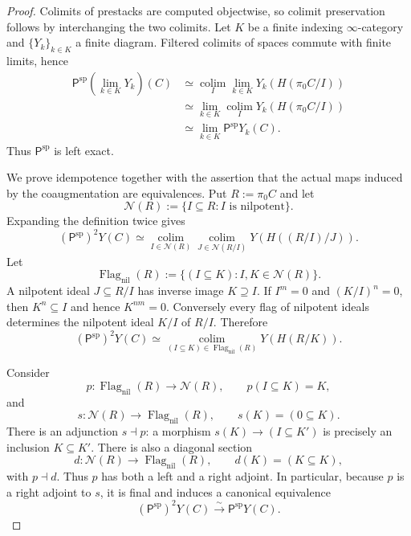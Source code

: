 \begin{proof}
Colimits of prestacks are computed objectwise, so colimit preservation follows
by interchanging the two colimits.  Let $K$ be a finite indexing
$\infty$-category and $\{Y_k\}_{k\in K}$ a finite diagram.  Filtered colimits
of spaces commute with finite limits, hence
\[
\begin{aligned}
    \mathsf P^{\mathrm{sp}}\!\left(\lim_{k\in K}Y_k\right)(C)
    &\simeq
    \operatorname*{colim}_{I}
    \lim_{k\in K}Y_k(H(\pi_0C/I))\\
    &\simeq
    \lim_{k\in K}
    \operatorname*{colim}_{I}
    Y_k(H(\pi_0C/I))\\
    &\simeq
    \lim_{k\in K}
    \mathsf P^{\mathrm{sp}}Y_k(C).
\end{aligned}
\]
Thus $\mathsf P^{\mathrm{sp}}$ is left exact.

We prove idempotence together with the assertion that the actual maps induced
by the coaugmentation are equivalences.  Put $R:=\pi_0C$ and let
\[
    \mathcal N(R)
    :=
    \{I\subseteq R:I\text{ is nilpotent}\}.
\]
Expanding the definition twice gives
\[
    (\mathsf P^{\mathrm{sp}})^2Y(C)
    \simeq
    \operatorname*{colim}_{I\in\mathcal N(R)}
    \operatorname*{colim}_{J\in\mathcal N(R/I)}
    Y\!\left(H((R/I)/J)\right).
\]
Let
\[
    \operatorname{Flag}_{\mathrm{nil}}(R)
    :=
    \{(I\subseteq K):I,K\in\mathcal N(R)\}.
\]
A nilpotent ideal $J\subseteq R/I$ has inverse image $K\supseteq I$.  If
$I^m=0$ and $(K/I)^n=0$, then $K^n\subseteq I$ and hence $K^{nm}=0$.
Conversely every flag of nilpotent ideals determines the nilpotent ideal
$K/I$ of $R/I$.  Therefore
\[
\boxed{
    (\mathsf P^{\mathrm{sp}})^2Y(C)
    \simeq
    \operatorname*{colim}_{(I\subseteq K)\in
      \operatorname{Flag}_{\mathrm{nil}}(R)}
    Y(H(R/K)).}
\]

Consider
\[
    p:\operatorname{Flag}_{\mathrm{nil}}(R)\longrightarrow\mathcal N(R),
    \qquad p(I\subseteq K)=K,
\]
and
\[
    s:\mathcal N(R)\longrightarrow\operatorname{Flag}_{\mathrm{nil}}(R),
    \qquad s(K)=(0\subseteq K).
\]
There is an adjunction $s\dashv p$: a morphism
$s(K)\to(I\subseteq K')$ is precisely an inclusion $K\subseteq K'$.
There is also a diagonal section
\[
    d:\mathcal N(R)\longrightarrow\operatorname{Flag}_{\mathrm{nil}}(R),
    \qquad d(K)=(K\subseteq K),
\]
with $p\dashv d$.  Thus $p$ has both a left and a right adjoint.  In
particular, because $p$ is a right adjoint to $s$, it is final and induces a
canonical equivalence
\[
\boxed{
    (\mathsf P^{\mathrm{sp}})^2Y(C)
    \xrightarrow{\sim}
    \mathsf P^{\mathrm{sp}}Y(C).}
\]


\end{proof}
